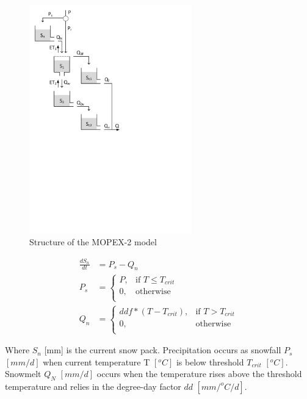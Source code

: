 { 																	%
\begin{figure}
\includegraphics[trim=1cm 13cm 7cm 1cm,width=7cm,keepaspectratio]{./AppA_files/30_schematic.pdf}
\caption{Structure of the MOPEX-2 model} \label{fig:30_schematic}
\end{figure}

\begin{align}
	\frac{dS_n}{dt} &= P_s-Q_{n} \\
	P_s &= \begin{cases}
		P, &\text{if } T \leq T_{crit} \\
		0, & \text{otherwise} \\
	\end{cases} \\
	Q_n &=\begin{cases}
		ddf*(T-T_{crit}), &\text{if } T > T_{crit} \\
		0, & \text{otherwise} \\
	\end{cases}
\end{align}

Where $S_n$ [mm] is the current snow pack. Precipitation occurs as snowfall $P_s$ $[mm/d]$ when current temperature T $[^oC]$ is below threshold $T_{crit}$ $[^oC]$. Snowmelt $Q_N$ $[mm/d]$ occurs when the temperature rises above the threshold temperature and relies in the degree-day factor $dd$ $[mm/^oC/d]$.

}
